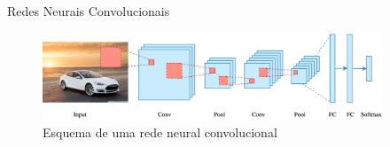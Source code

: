 \documentclass{beamer}
\begin{document}
\begin{frame}{Redes Neurais Convolucionais}

    \begin{figure}
        \includegraphics[width=4in]{img/convolucao.png} 
        \caption{Esquema de uma rede neural convolucional}
    \end{figure}
    
    \begin{figure}
        \centering

\end{figure}
\end{frame}
\end{document}
